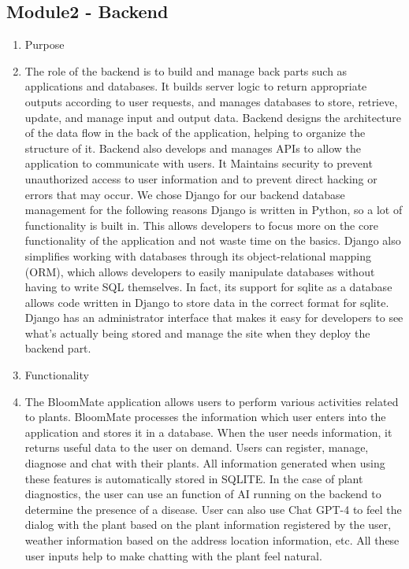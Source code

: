 \documentclass[conference, a4paper]{IEEEtran}
\begin{document}
\subsection{Module2 - Backend}
\begin{enumerate}
    \item Purpose
    \item[] The role of the backend is to build and manage back parts such as applications and databases. It builds server logic to return appropriate outputs according to user requests, and manages databases to store, retrieve, update, and manage input and output data. Backend designs the architecture of the data flow in the back of the application, helping to organize the structure of it. Backend also develops and manages APIs to allow the application to communicate with users. It Maintains security to prevent unauthorized access to user information and to prevent direct hacking or errors that may occur. We chose Django for our backend database management for the following reasons Django is written in Python, so a lot of functionality is built in. This allows developers to focus more on the core functionality of the application and not waste time on the basics. Django also simplifies working with databases through its object-relational mapping (ORM), which allows developers to easily manipulate databases without having to write SQL themselves. In fact, its support for sqlite as a database allows code written in Django to store data in the correct format for sqlite. Django has an administrator interface that makes it easy for developers to see what's actually being stored and manage the site when they deploy the backend part.\\
    \item Functionality
    \item[] The BloomMate application allows users to perform various activities related to plants. BloomMate processes the information which user enters into the application and stores it in a database. When the user needs information, it returns useful data to the user on demand. Users can register, manage, diagnose and chat with their plants. All information generated when using these features is automatically stored in SQLITE. In the case of plant diagnostics, the user can use an function of AI running on the backend to determine the presence of a disease. User can also use Chat GPT-4 to feel the dialog with the plant based on the plant information registered by the user, weather information based on the address location information, etc. All these user inputs help to make chatting with the plant feel natural.\\

\end{enumerate}
\end{document}
